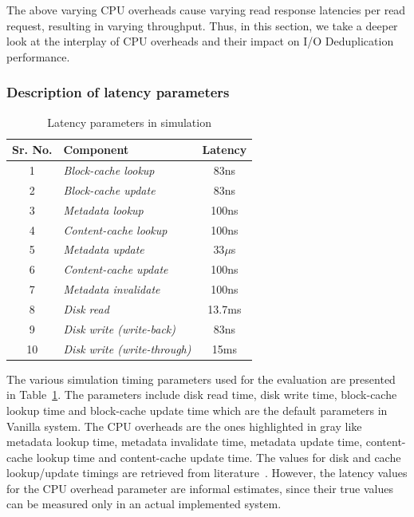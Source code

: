 The above varying
CPU overheads cause varying read response latencies per read request,
resulting in varying throughput.
Thus, in this section, we take a deeper look
at the interplay of CPU overheads and their impact on I/O Deduplication
performance. 

\subsubsection{Description of latency parameters}
\begin{table}
\caption{Latency parameters in simulation}
\label{tab:simul-params}
\centering
\begin{tabular}{|c|l|c|} \hline
\textbf{Sr. No.} & \textbf{Component} & Latency \\ \hline
1 & \textit{Block-cache lookup} & 83ns \\
2 & \textit{Block-cache update} & 83ns \\
\rowcolor{Gray} 3 & \textit{Metadata lookup} & 100ns \\
\rowcolor{Gray} 4 & \textit{Content-cache lookup} & 100ns \\
\rowcolor{Gray} 5 & \textit{Metadata update} & 33$\mu$s \\
\rowcolor{Gray} 6 & \textit{Content-cache update} & 100ns \\
\rowcolor{Gray} 7 & \textit{Metadata invalidate} & 100ns \\
8 & \textit{Disk read} & 13.7ms \\
9 & \textit{Disk write (write-back)} & 83ns \\ 
10 & \textit{Disk write (write-through)} & 15ms \\ \hline
\end{tabular}
\end{table}


The various simulation timing parameters used for the evaluation are presented
in Table~\ref{tab:simul-params}. The parameters include disk read
time, disk write time, block-cache lookup time and block-cache update time
which are the default parameters in Vanilla system. The CPU overheads are
the ones highlighted in gray like metadata lookup time, metadata invalidate time,
metadata update time, content-cache lookup time and content-cache update time.
The values for disk and cache lookup/update timings are retrieved 
from literature~\cite{gustavo-blogpost, rules-of-thumb}. However, the latency values for the
CPU overhead parameter are informal estimates, since their true values can be 
measured only in an actual implemented system.

